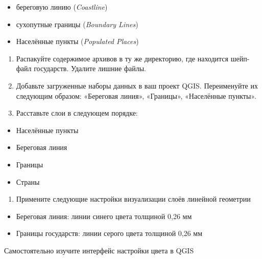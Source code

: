 \documentclass[
  12pt,
]{book}
\providecommand{\tightlist}{%
  \setlength{\itemsep}{0pt}\setlength{\parskip}{0pt}}
\begin{document}
\begin{itemize}
\tightlist
\item
  береговую линию (\emph{Coastline})
\item
  сухопутные границы (\emph{Boundary Lines})
\item
  Населённые пункты (\emph{Populated Places})
\end{itemize}

\begin{enumerate}
\def\labelenumi{\arabic{enumi}.}
\setcounter{enumi}{1}
\item
  Распакуйте содержимое архивов в ту же директорию, где находится шейп-файл государств. Удалите лишние файлы.
\item
  Добавьте загруженные наборы данных в ваш проект QGIS. Переименуйте их следующим образом: «Береговая линия», «Границы», «Населённые пункты».
\item
  Расставьте слои в следующем порядке:
\end{enumerate}

\begin{itemize}
\tightlist
\item
  Населённые пункты
\item
  Береговая линия
\item
  Границы
\item
  Страны
\end{itemize}

\begin{enumerate}
\def\labelenumi{\arabic{enumi}.}
\setcounter{enumi}{4}
\tightlist
\item
  Примените следующие настройки визуализации слоёв линейной геометрии
\end{enumerate}

\begin{itemize}
\tightlist
\item
  Береговая линия: линии синего цвета толщиной 0,26 мм
\item
  Границы государств: линии серого цвета толщиной 0,26 мм
\end{itemize}

Самостоятельно изучите интерфейс настройки цвета в QGIS
\end{document}
